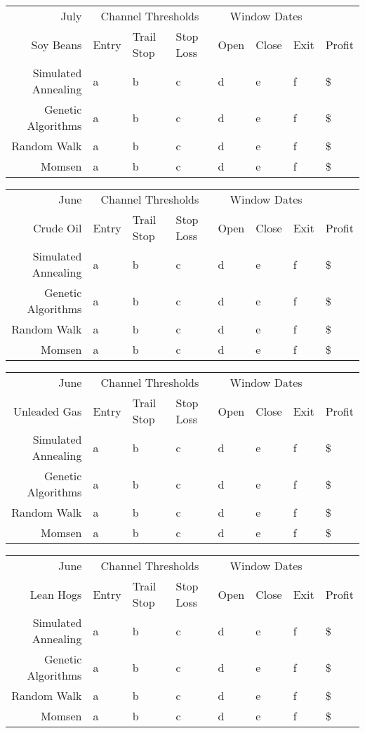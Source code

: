\documentclass[12pt]{article}
\begin{document}
\begin{tabular}{|r|l|l|l|l|l|l|l|}
  \hline
  July & \multicolumn{3}{|c|}{Channel Thresholds} & \multicolumn{3}{|c|}{Window Dates} &  \\
  Soy Beans & Entry & Trail Stop & Stop Loss & Open & Close & Exit & Profit\\ \hline
  Simulated Annealing & a & b & c & d & e & f & \$ \\ \hline
  Genetic Algorithms & a & b & c & d & e & f & \$ \\ \hline
  Random Walk & a & b & c & d & e & f & \$ \\ \hline
  Momsen &  a & b & c & d & e & f & \$ \\ \hline
\end{tabular}

\begin{tabular}{|r|l|l|l|l|l|l|l|}
  \hline
  June & \multicolumn{3}{|c|}{Channel Thresholds} & \multicolumn{3}{|c|}{Window Dates} &  \\
  Crude Oil & Entry & Trail Stop & Stop Loss & Open & Close & Exit & Profit\\ \hline
  Simulated Annealing & a & b & c & d & e & f & \$ \\ \hline
  Genetic Algorithms & a & b & c & d & e & f & \$ \\ \hline
  Random Walk & a & b & c & d & e & f & \$ \\ \hline
  Momsen &  a & b & c & d & e & f & \$ \\ \hline
\end{tabular}

\begin{tabular}{|r|l|l|l|l|l|l|l|}
  \hline
  June & \multicolumn{3}{|c|}{Channel Thresholds} & \multicolumn{3}{|c|}{Window Dates} &  \\
  Unleaded Gas & Entry & Trail Stop & Stop Loss & Open & Close & Exit & Profit\\ \hline
  Simulated Annealing & a & b & c & d & e & f & \$ \\ \hline
  Genetic Algorithms & a & b & c & d & e & f & \$ \\ \hline
  Random Walk & a & b & c & d & e & f & \$ \\ \hline
  Momsen &  a & b & c & d & e & f & \$ \\ \hline
\end{tabular}

\begin{tabular}{|r|l|l|l|l|l|l|l|}
  \hline
  June & \multicolumn{3}{|c|}{Channel Thresholds} & \multicolumn{3}{|c|}{Window Dates} &  \\
  Lean Hogs & Entry & Trail Stop & Stop Loss & Open & Close & Exit & Profit\\ \hline
  Simulated Annealing & a & b & c & d & e & f & \$ \\ \hline
  Genetic Algorithms & a & b & c & d & e & f & \$ \\ \hline
  Random Walk & a & b & c & d & e & f & \$ \\ \hline
  Momsen &  a & b & c & d & e & f & \$ \\ \hline
\end{tabular}
\end{document}
